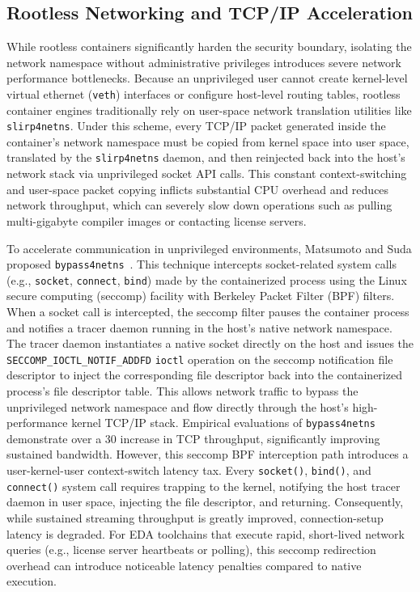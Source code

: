 \subsection{Rootless Networking and TCP/IP Acceleration}
While rootless containers significantly harden the security boundary, isolating the network namespace without administrative privileges introduces severe network performance bottlenecks. Because an unprivileged user cannot create kernel-level virtual ethernet (\texttt{veth}) interfaces or configure host-level routing tables, rootless container engines traditionally rely on user-space network translation utilities like \texttt{slirp4netns}. Under this scheme, every TCP/IP packet generated inside the container's network namespace must be copied from kernel space into user space, translated by the \texttt{slirp4netns} daemon, and then reinjected back into the host's network stack via unprivileged socket API calls. This constant context-switching and user-space packet copying inflicts substantial CPU overhead and reduces network throughput, which can severely slow down operations such as pulling multi-gigabyte compiler images or contacting license servers.

To accelerate communication in unprivileged environments, Matsumoto and Suda proposed \texttt{bypass4netns}~\cite{Matsumoto2024bypass4netns}. This technique intercepts socket-related system calls (e.g., \texttt{socket}, \texttt{connect}, \texttt{bind}) made by the containerized process using the Linux secure computing (seccomp) facility with Berkeley Packet Filter (BPF) filters. When a socket call is intercepted, the seccomp filter pauses the container process and notifies a tracer daemon running in the host's native network namespace. The tracer daemon instantiates a native socket directly on the host and issues the \texttt{SECCOMP\_IOCTL\_NOTIF\_ADDFD} \texttt{ioctl} operation on the seccomp notification file descriptor to inject the corresponding file descriptor back into the containerized process's file descriptor table. This allows network traffic to bypass the unprivileged network namespace and flow directly through the host's high-performance kernel TCP/IP stack. Empirical evaluations of \texttt{bypass4netns} demonstrate over a \qty{30}{\times} increase in TCP throughput, significantly improving sustained bandwidth. However, this seccomp BPF interception path introduces a user-kernel-user context-switch latency tax. Every \texttt{socket()}, \texttt{bind()}, and \texttt{connect()} system call requires trapping to the kernel, notifying the host tracer daemon in user space, injecting the file descriptor, and returning. Consequently, while sustained streaming throughput is greatly improved, connection-setup latency is degraded. For EDA toolchains that execute rapid, short-lived network queries (e.g., license server heartbeats or polling), this seccomp redirection overhead can introduce noticeable latency penalties compared to native execution.


